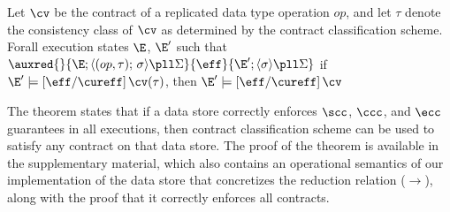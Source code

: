 

\begin{theorem}
\label{lem:core-preservation}
Let $\cv$ be the contract of a replicated data type operation $op$,
and let $\tau$ denote the consistency class of $\cv$
as determined by the contract classification scheme. Forall execution
states $\E$, $\E'$ such that
$\auxred{} {\E;\langle (op,\tau);\,\sigma \rangle \pll \Sigma} {\eff}
 {\E';\langle \sigma \rangle \pll \Sigma}$
if $\E' \models [\eff/\cureff]\,\cv(\tau)$, then $\E' \models [\eff/\cureff]\,\cv$
\end{theorem}

The theorem states that if a data store correctly enforces $\scc$,
$\ccc$, and $\ecc$ guarantees in all executions, then contract
classification scheme can be used to satisfy any \name contract on
that data store. The proof of the theorem is available in the supplementary
material, which also contains an operational
semantics of our implementation of the data store that concretizes
the reduction relation ($\xrightarrow{}$), along with the proof
that it correctly enforces all \name contracts.
